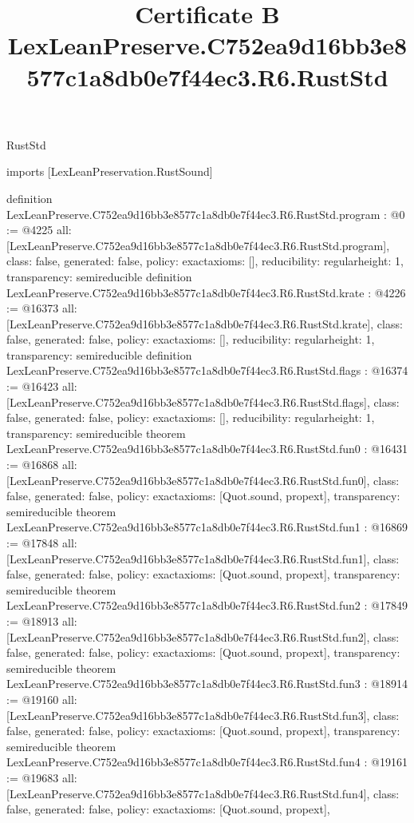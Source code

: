 \begin{lexlean}{RustStd}
\title{Certificate B LexLeanPreserve.C752ea9d16bb3e8577c1a8db0e7f44ec3.R6.RustStd}
\begin{coremodule}
imports [LexLeanPreservation.RustSound]

definition LexLeanPreserve.C752ea9d16bb3e8577c1a8db0e7f44ec3.R6.RustStd.program : @0 := @4225 {
  all: [LexLeanPreserve.C752ea9d16bb3e8577c1a8db0e7f44ec3.R6.RustStd.program],
  class: false,
  generated: false,
  policy: exact{axioms: []},
  reducibility: regular{height: 1},
  transparency: semireducible
}
definition LexLeanPreserve.C752ea9d16bb3e8577c1a8db0e7f44ec3.R6.RustStd.krate : @4226 := @16373 {
  all: [LexLeanPreserve.C752ea9d16bb3e8577c1a8db0e7f44ec3.R6.RustStd.krate],
  class: false,
  generated: false,
  policy: exact{axioms: []},
  reducibility: regular{height: 1},
  transparency: semireducible
}
definition LexLeanPreserve.C752ea9d16bb3e8577c1a8db0e7f44ec3.R6.RustStd.flags : @16374 := @16423 {
  all: [LexLeanPreserve.C752ea9d16bb3e8577c1a8db0e7f44ec3.R6.RustStd.flags],
  class: false,
  generated: false,
  policy: exact{axioms: []},
  reducibility: regular{height: 1},
  transparency: semireducible
}
theorem LexLeanPreserve.C752ea9d16bb3e8577c1a8db0e7f44ec3.R6.RustStd.fun0 : @16431 := @16868 {
  all: [LexLeanPreserve.C752ea9d16bb3e8577c1a8db0e7f44ec3.R6.RustStd.fun0],
  class: false,
  generated: false,
  policy: exact{axioms: [Quot.sound, propext]},
  transparency: semireducible
}
theorem LexLeanPreserve.C752ea9d16bb3e8577c1a8db0e7f44ec3.R6.RustStd.fun1 : @16869 := @17848 {
  all: [LexLeanPreserve.C752ea9d16bb3e8577c1a8db0e7f44ec3.R6.RustStd.fun1],
  class: false,
  generated: false,
  policy: exact{axioms: [Quot.sound, propext]},
  transparency: semireducible
}
theorem LexLeanPreserve.C752ea9d16bb3e8577c1a8db0e7f44ec3.R6.RustStd.fun2 : @17849 := @18913 {
  all: [LexLeanPreserve.C752ea9d16bb3e8577c1a8db0e7f44ec3.R6.RustStd.fun2],
  class: false,
  generated: false,
  policy: exact{axioms: [Quot.sound, propext]},
  transparency: semireducible
}
theorem LexLeanPreserve.C752ea9d16bb3e8577c1a8db0e7f44ec3.R6.RustStd.fun3 : @18914 := @19160 {
  all: [LexLeanPreserve.C752ea9d16bb3e8577c1a8db0e7f44ec3.R6.RustStd.fun3],
  class: false,
  generated: false,
  policy: exact{axioms: [Quot.sound, propext]},
  transparency: semireducible
}
theorem LexLeanPreserve.C752ea9d16bb3e8577c1a8db0e7f44ec3.R6.RustStd.fun4 : @19161 := @19683 {
  all: [LexLeanPreserve.C752ea9d16bb3e8577c1a8db0e7f44ec3.R6.RustStd.fun4],
  class: false,
  generated: false,
  policy: exact{axioms: [Quot.sound, propext]},
}
\end{coremodule}
\end{lexlean}
